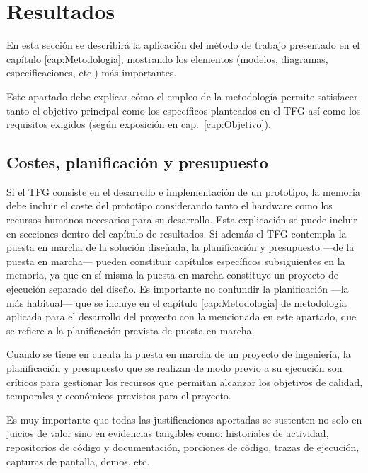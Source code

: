 \chapter{Resultados}
\label{cap:Resultados}

En esta sección se describirá la aplicación del método de trabajo presentado en el capítulo \ref{cap:Metodologia},  mostrando los elementos (modelos, diagramas, especificaciones, etc.) más importantes. 

Este apartado debe explicar cómo el empleo de la metodología permite satisfacer tanto el objetivo principal como los específicos planteados en el TFG así como los requisitos exigidos (según exposición en cap.~\ref{cap:Objetivo}).

\section{Costes, planificación y presupuesto}
Si el TFG consiste en el desarrollo e implementación de un prototipo, la memoria  debe incluir el coste del prototipo considerando tanto el hardware como los recursos humanos necesarios para su desarrollo. Esta explicación se puede incluir en secciones dentro del capítulo de resultados. Si además el TFG contempla la puesta en marcha de la solución diseñada, la planificación y presupuesto ---de la puesta en marcha--- pueden constituir capítulos específicos subsiguientes en la memoria, ya que en sí misma la puesta en marcha constituye un proyecto de ejecución separado del diseño. Es importante no confundir la planificación ---la más habitual--- que se incluye en el capítulo \ref{cap:Metodologia} de metodología aplicada para el desarrollo del proyecto con la mencionada en este apartado, que se refiere a la planificación prevista de puesta en marcha.

Cuando se tiene en cuenta la puesta en marcha de un proyecto de ingeniería, la planificación y presupuesto que se realizan de modo previo a su ejecución son críticos para gestionar los recursos que permitan alcanzar los objetivos de calidad, temporales y económicos previstos para el proyecto. 

Es muy importante que todas las justificaciones aportadas se sustenten no solo en juicios de valor sino en evidencias tangibles como: historiales de actividad, repositorios de código y documentación, porciones de código, trazas de ejecución, capturas de pantalla, demos, etc.
